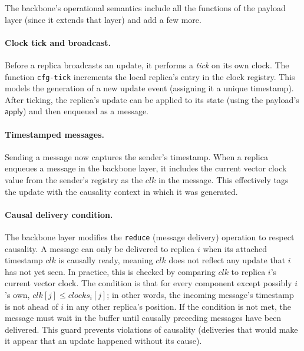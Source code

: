 The backbone’s operational semantics include all the functions of the payload layer (since it extends that layer) and add a few more.

\paragraph{Clock tick and broadcast.}
Before a replica broadcasts an update, it performs a \emph{tick} on its own clock. The function \texttt{cfg-tick} increments the local replica’s entry in the clock registry. This models the generation of a new update event (assigning it a unique timestamp). After ticking, the replica’s update can be applied to its state (using the payload’s $\mathsf{apply}$) and then enqueued as a message.

\paragraph{Timestamped messages.}
Sending a message now captures the sender’s timestamp. When a replica enqueues a message in the backbone layer, it includes the current vector clock value from the sender’s registry as the $clk$ in the message. This effectively tags the update with the causality context in which it was generated.

\paragraph{Causal delivery condition.}
The backbone layer modifies the \texttt{reduce} (message delivery) operation to respect causality. A message can only be delivered to replica $i$ when its attached timestamp $clk$ is causally ready, meaning $clk$ does not reflect any update that $i$ has not yet seen. In practice, this is checked by comparing $clk$ to replica $i$’s current vector clock. The condition is that for every component except possibly $i$’s own, $clk[j] \le \mathit{clocks}_i[j]$; in other words, the incoming message’s timestamp is not ahead of $i$ in any other replica’s position. If the condition is not met, the message must wait in the buffer until causally preceding messages have been delivered. This guard prevents violations of causality (deliveries that would make it appear that an update happened without its cause).

